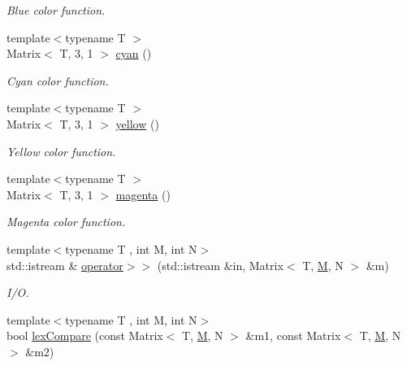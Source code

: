 \begin{DoxyCompactItemize}
\begin{DoxyCompactList}\small\item\em Blue color function. \end{DoxyCompactList}\item 
\hypertarget{group___primary_colors_gac171b7ffb96afd731cdb154a9eb41f1c}{{\footnotesize template$<$typename T $>$ }\\Matrix$<$ T, 3, 1 $>$ \hyperlink{group___primary_colors_gac171b7ffb96afd731cdb154a9eb41f1c}{cyan} ()}\label{group___primary_colors_gac171b7ffb96afd731cdb154a9eb41f1c}

\begin{DoxyCompactList}\small\item\em Cyan color function. \end{DoxyCompactList}\item 
\hypertarget{group___primary_colors_ga03c463032ad2ac98a3661c1801fea9cb}{{\footnotesize template$<$typename T $>$ }\\Matrix$<$ T, 3, 1 $>$ \hyperlink{group___primary_colors_ga03c463032ad2ac98a3661c1801fea9cb}{yellow} ()}\label{group___primary_colors_ga03c463032ad2ac98a3661c1801fea9cb}

\begin{DoxyCompactList}\small\item\em Yellow color function. \end{DoxyCompactList}\item 
\hypertarget{group___primary_colors_gadfcf6ebbbe83635103749fc438e1b4a0}{{\footnotesize template$<$typename T $>$ }\\Matrix$<$ T, 3, 1 $>$ \hyperlink{group___primary_colors_gadfcf6ebbbe83635103749fc438e1b4a0}{magenta} ()}\label{group___primary_colors_gadfcf6ebbbe83635103749fc438e1b4a0}

\begin{DoxyCompactList}\small\item\em Magenta color function. \end{DoxyCompactList}\item 
\hypertarget{group___eigen_typedefs_ga393e43d3acb273916941d5f75e5a9c3d}{{\footnotesize template$<$typename T , int M, int N$>$ }\\std\-::istream \& \hyperlink{group___eigen_typedefs_ga393e43d3acb273916941d5f75e5a9c3d}{operator$>$$>$} (std\-::istream \&in, Matrix$<$ T, \hyperlink{struct_d_o_1_1_m}{M}, N $>$ \&m)}\label{group___eigen_typedefs_ga393e43d3acb273916941d5f75e5a9c3d}

\begin{DoxyCompactList}\small\item\em I/\-O. \end{DoxyCompactList}\item 
\hypertarget{group___eigen_typedefs_ga9b2a3c755e12d93b990fb4bbefaec6b6}{{\footnotesize template$<$typename T , int M, int N$>$ }\\bool \hyperlink{group___eigen_typedefs_ga9b2a3c755e12d93b990fb4bbefaec6b6}{lex\-Compare} (const Matrix$<$ T, \hyperlink{struct_d_o_1_1_m}{M}, N $>$ \&m1, const Matrix$<$ T, \hyperlink{struct_d_o_1_1_m}{M}, N $>$ \&m2)}\label{group___eigen_typedefs_ga9b2a3c755e12d93b990fb4bbefaec6b6}


\end{DoxyCompactItemize}
